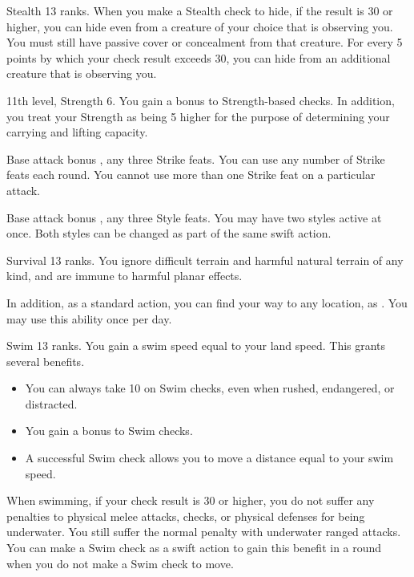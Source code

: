 \featpre Stealth 13 ranks.
\featben When you make a Stealth check to hide, if the result is 30 or higher, you can hide even from a creature of your choice that is observing you. You must still have passive cover or concealment from that creature. For every 5 points by which your check result exceeds 30, you can hide from an additional creature that is observing you.

\featpre 11th level, Strength 6.
\featben You gain a  bonus to Strength-based checks. In addition, you treat your Strength as being 5 higher for the purpose of determining your carrying and lifting capacity.

\featpre Base attack bonus , any three Strike feats.
\featben You can use any number of Strike feats each round. You cannot use more than one Strike feat on a particular attack.

\featpre Base attack bonus , any three Style feats.
\featben You may have two styles active at once. Both styles can be changed as part of the same swift action.

\featpre Survival 13 ranks.
\featben You ignore difficult terrain and harmful natural terrain of any kind, and are immune to harmful planar effects.

In addition, as a standard action, you can find your way to any location, as . You may use this ability once per day.

\featpre Swim 13 ranks.
\featben You gain a swim speed equal to your land speed. This grants several benefits.
\begin{itemize}
    \item You can always take 10 on Swim checks, even when rushed, endangered, or distracted.
    \item You gain a  bonus to Swim checks.
    \item A successful Swim check allows you to move a distance equal to your swim speed.
\end{itemize}

When swimming, if your check result is 30 or higher, you do not suffer any penalties to physical melee attacks, checks, or physical defenses for being underwater. You still suffer the normal penalty with underwater ranged attacks. You can make a Swim check as a swift action to gain this benefit in a round when you do not make a Swim check to move.

